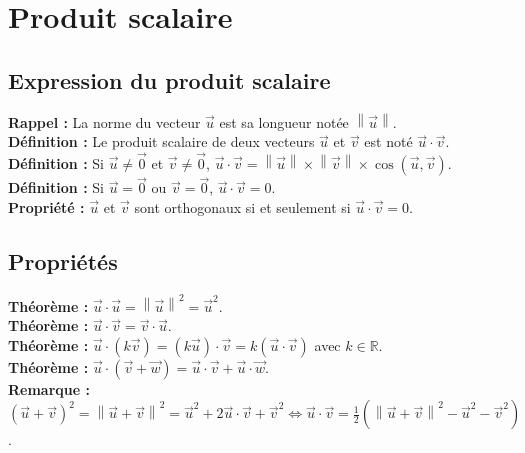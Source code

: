 \documentclass[a4paper,titlepage]{article}
\let\oldsection\section
\renewcommand\section{\clearpage\oldsection}
\begin{document}
\section{Produit scalaire}
    \subsection{Expression du produit scalaire}
        \textbf{Rappel :} La norme du vecteur $\vec{u}$ est sa longueur notée $\left\|\vec{u}\right\|$.
        \\
        \textbf{Définition :} Le produit scalaire de deux vecteurs $\vec{u}$ et $\vec{v}$ est noté $\vec{u}\cdot\vec{v}$.
        \\
        \textbf{Définition :} Si $\vec{u}\neq\overrightarrow{0}$ et $\vec{v}\neq\overrightarrow{0}$, $\vec{u}\cdot\vec{v}=\left\|\vec{u}\right\|\times\left\|\vec{v}\right\|\times\cos\left(\vec{u},\vec{v}\right)$.
        \\
        \textbf{Définition :} Si $\vec{u}=\overrightarrow{0}$ ou $\vec{v}=\overrightarrow{0}$, $\vec{u}\cdot\vec{v}=0$.
        \\
        \textbf{Propriété :} $\vec{u}$ et $\vec{v}$ sont orthogonaux si et seulement si $\vec{u}\cdot\vec{v}=0$.
    \subsection{Propriétés}
        \textbf{Théorème :} $\vec{u}\cdot\vec{u}=\left\|\vec{u}\right\|^{2}=\vec{u}^{2}$.
        \\
        \textbf{Théorème :} $\vec{u}\cdot\vec{v}=\vec{v}\cdot\vec{u}$.
        \\
        \textbf{Théorème :} $\vec{u}\cdot\left(k\vec{v}\right)=\left(k\vec{u}\right)\cdot\vec{v}=k\left(\vec{u}\cdot\vec{v}\right)$ avec $k\in\mathbb{R}$.
        \\
        \textbf{Théorème :} $\vec{u}\cdot\left(\vec{v}+\vec{w}\right)=\vec{u}\cdot\vec{v}+\vec{u}\cdot\vec{w}$.
        \\
        \textbf{Remarque :} $\left(\vec{u}+\vec{v}\right)^{2}=\left\|\vec{u}+\vec{v}\right\|^{2}=\vec{u}^{2}+2\vec{u}\cdot\vec{v}+\vec{v}^{2}\Leftrightarrow\vec{u}\cdot\vec{v}=\frac{1}{2}\left(\left\|\vec{u}+\vec{v}\right\|^{2}-\vec{u}^{2}-\vec{v}^{2}\right)$.
\end{document}
